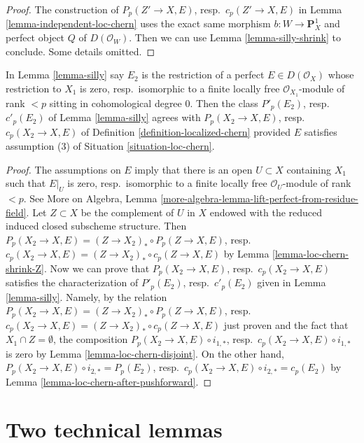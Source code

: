 \begin{proof}
The construction of $P_p(Z' \to X, E)$,
resp.\ $c_p(Z' \to X, E)$ in Lemma \ref{lemma-independent-loc-chern}
uses the exact same morphism
$b : W \to \mathbf{P}^1_X$ and perfect object $Q$ of $D(\mathcal{O}_W)$.
Then we can use Lemma \ref{lemma-silly-shrink} to conclude.
Some details omitted.
\end{proof}

\begin{lemma}
\label{lemma-loc-chern-agree}
In Lemma \ref{lemma-silly} say $E_2$ is the restriction of a perfect
$E \in D(\mathcal{O}_X)$ whose restriction to $X_1$ is zero,
resp.\ isomorphic to a finite locally free $\mathcal{O}_{X_1}$-module
of rank $< p$ sitting in cohomological degree $0$. Then the class
$P'_p(E_2)$, resp.\ $c'_p(E_2)$ of Lemma \ref{lemma-silly} agrees with
$P_p(X_2 \to X, E)$, resp.\ $c_p(X_2 \to X, E)$ of
Definition \ref{definition-localized-chern} provided $E$ satisfies
assumption (3) of Situation \ref{situation-loc-chern}.
\end{lemma}

\begin{proof}
The assumptions on $E$ imply that there is an open $U \subset X$
containing $X_1$ such that $E|_U$ is zero, resp.\ isomorphic to a finite locally
free $\mathcal{O}_U$-module of rank $< p$. See More on Algebra, Lemma
\ref{more-algebra-lemma-lift-perfect-from-residue-field}.
Let $Z \subset X$ be the complement of $U$ in $X$ endowed with
the reduced induced closed subscheme structure. Then
$P_p(X_2 \to X, E) = (Z \to X_2)_* \circ P_p(Z \to X, E)$,
resp.\ $c_p(X_2 \to X, E) = (Z \to X_2)_* \circ c_p(Z \to X, E)$
by Lemma \ref{lemma-loc-chern-shrink-Z}.
Now we can prove that $P_p(X_2 \to X, E)$, resp.\ $c_p(X_2 \to X, E)$
satisfies the characterization of $P'_p(E_2)$, resp.\ $c'_p(E_2)$
given in Lemma \ref{lemma-silly}. Namely, by the relation
$P_p(X_2 \to X, E) = (Z \to X_2)_* \circ P_p(Z \to X, E)$,
resp.\ $c_p(X_2 \to X, E) = (Z \to X_2)_* \circ c_p(Z \to X, E)$
just proven and the fact that $X_1 \cap Z = \emptyset$,
the composition $P_p(X_2 \to X, E) \circ i_{1, *}$,
resp.\ $c_p(X_2 \to X, E) \circ i_{1, *}$ is zero
by Lemma \ref{lemma-loc-chern-disjoint}.
On the other hand,
$P_p(X_2 \to X, E) \circ i_{2, *} = P_p(E_2)$,
resp.\ $c_p(X_2 \to X, E) \circ i_{2, *} = c_p(E_2)$
by Lemma \ref{lemma-loc-chern-after-pushforward}.
\end{proof}





\section{Two technical lemmas}
\label{section-tools-loc-chern}

